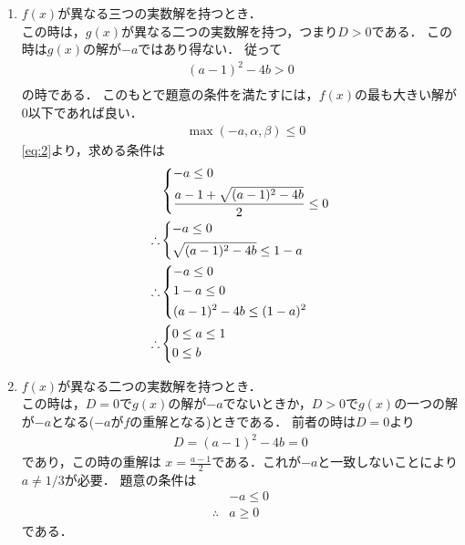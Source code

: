 \documentclass[a4paper,10pt]{ltjsarticle}
\begin{document}
\begin{multicols}{2}
  \begin{enumerate}
    \item $f(x)$が異なる三つの実数解を持つとき．\\
          この時は，$g(x)$が異なる二つの実数解を持つ，つまり$D>0$である．
          この時は$g(x)$の解が$-a$ではあり得ない．
          従って
          \begin{align*}
            (a-1)^2-4b > 0 \\
          \end{align*}
          の時である．
          このもとで題意の条件を満たすには，$f(x)$の最も大きい解が$0$以下であれば良い．
          \begin{align*}
             & \max(-a, \alpha, \beta) \le 0
          \end{align*}
          \cref{eq:2}より，求める条件は
          \begin{align*}
             & \begin{dcases}
                 -a \le 0 \\
                 \frac{a-1 + \sqrt{(a-1)^2-4b}}{2} \le 0
               \end{dcases} \\
            \therefore
             & \begin{dcases}
                 -a \le 0 \\
                 \sqrt{(a-1)^2-4b} \le 1-a
               \end{dcases}                    \\
            \therefore
             & \begin{dcases}
                 -a \le 0  \\
                 1-a \le 0 \\
                 (a-1)^2-4b \le (1-a)^2
               \end{dcases}                       \\
            \therefore
             & \begin{dcases}
                 0 \le a \le 1 \\
                 0 \le b
               \end{dcases}
          \end{align*}
    \item $f(x)$が異なる二つの実数解を持つとき．\\
          この時は，$D=0$で$g(x)$の解が$-a$でないときか，$D>0$で$g(x)$の一つの解が$-a$となる($-a$が$f$の重解となる)ときである．
          前者の時は$D=0$より
          \begin{align*}
            D = (a-1)^2 -4b = 0
          \end{align*}
          であり，この時の重解は $x = \frac{a-1}{2}$である．これが$-a$と一致しないことにより$a\neq 1/3$が必要．
          題意の条件は
          \begin{align*}
             & -a \le 0 \\
            \therefore
             & a \ge 0
          \end{align*}
          である．


\end{enumerate}
\end{multicols}
\end{document}
